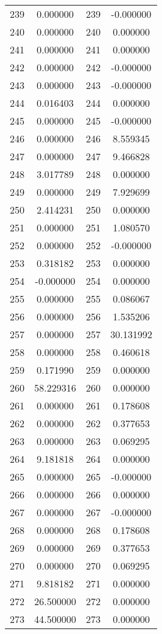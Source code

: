 \documentclass[12pt]{article}
\begin{document}
\begin{longtable}{@{}cccc@{}}
239 & 0.000000 & 239 & -0.000000 \\
240 & 0.000000 & 240 & 0.000000 \\
241 & 0.000000 & 241 & 0.000000 \\
242 & 0.000000 & 242 & -0.000000 \\
243 & 0.000000 & 243 & -0.000000 \\
244 & 0.016403 & 244 & 0.000000 \\
245 & 0.000000 & 245 & -0.000000 \\
246 & 0.000000 & 246 & 8.559345 \\
247 & 0.000000 & 247 & 9.466828 \\
248 & 3.017789 & 248 & 0.000000 \\
249 & 0.000000 & 249 & 7.929699 \\
250 & 2.414231 & 250 & 0.000000 \\
251 & 0.000000 & 251 & 1.080570 \\
252 & 0.000000 & 252 & -0.000000 \\
253 & 0.318182 & 253 & 0.000000 \\
254 & -0.000000 & 254 & 0.000000 \\
255 & 0.000000 & 255 & 0.086067 \\
256 & 0.000000 & 256 & 1.535206 \\
257 & 0.000000 & 257 & 30.131992 \\
258 & 0.000000 & 258 & 0.460618 \\
259 & 0.171990 & 259 & 0.000000 \\
260 & 58.229316 & 260 & 0.000000 \\
261 & 0.000000 & 261 & 0.178608 \\
262 & 0.000000 & 262 & 0.377653 \\
263 & 0.000000 & 263 & 0.069295 \\
264 & 9.181818 & 264 & 0.000000 \\
265 & 0.000000 & 265 & -0.000000 \\
266 & 0.000000 & 266 & 0.000000 \\
267 & 0.000000 & 267 & -0.000000 \\
268 & 0.000000 & 268 & 0.178608 \\
269 & 0.000000 & 269 & 0.377653 \\
270 & 0.000000 & 270 & 0.069295 \\
271 & 9.818182 & 271 & 0.000000 \\
272 & 26.500000 & 272 & 0.000000 \\
273 & 44.500000 & 273 & 0.000000 \\

\end{longtable}
\end{document}
